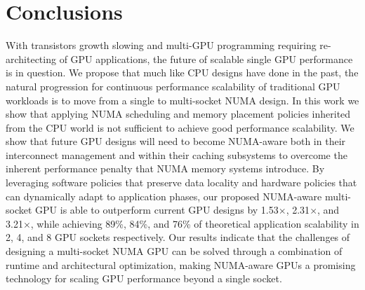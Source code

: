 \section{Conclusions}
\label{conclusions}
With transistors growth slowing and multi-GPU programming requiring 
re-architecting of GPU applications, the future of scalable single GPU 
performance is in question.  We propose that much like CPU designs have done in 
the past, the natural progression for continuous performance scalability of 
traditional GPU workloads is to move from a single to multi-socket NUMA design.  
In this work we show 
that applying NUMA scheduling and memory placement policies inherited 
from the CPU world is not sufficient to achieve good performance scalability.  
We show that future GPU designs will need to become NUMA-aware both in their 
interconnect management and within their caching subsystems to overcome the 
inherent performance penalty that NUMA memory systems introduce.  By leveraging 
software policies that preserve data locality and hardware policies that can 
dynamically adapt to application phases, our proposed NUMA-aware multi-socket GPU is able to 
outperform current GPU designs by 1.53$\times$, 2.31$\times$, and
3.21$\times$, while achieving 89\%, 84\%, and 76\% of theoretical application scalability in 2, 4, 
and 8 GPU sockets respectively. Our results indicate that the 
challenges of designing a multi-socket NUMA GPU can be solved through a combination
of runtime and architectural optimization, making 
NUMA-aware GPUs a promising technology for scaling GPU performance beyond a 
single socket.


